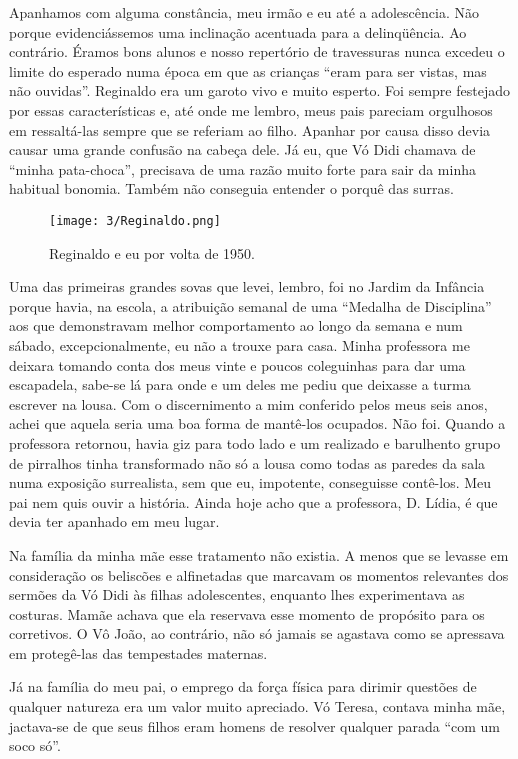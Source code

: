 Apanhamos com alguma constância, meu irmão e eu até a adolescência. 
Não porque evidenciássemos uma inclinação acentuada para a delinqüência. 
Ao contrário. 
Éramos bons alunos e nosso repertório de travessuras nunca excedeu o limite do esperado numa época em que as crianças “eram para ser vistas, mas não ouvidas”. 
Reginaldo era um garoto vivo e muito esperto. 
Foi sempre festejado por essas características e, até onde me lembro, meus pais pareciam orgulhosos em ressaltá-las sempre que se referiam ao filho. 
Apanhar por causa disso devia causar uma grande confusão na cabeça dele. Já eu, que Vó Didi chamava de “minha pata-choca”, precisava de uma razão muito forte para sair da minha habitual bonomia. 
Também não conseguia entender o porquê das surras.

\begin{figure}[H]
\centering
\texttt{[image: 3/Reginaldo.png]}
\caption{Reginaldo e eu por volta de 1950.}
\end{figure}

Uma das primeiras grandes sovas que levei, lembro, foi no Jardim da Infância porque havia, na escola, a atribuição semanal de uma “Medalha de Disciplina” aos que demonstravam melhor comportamento ao longo da semana e num sábado, excepcionalmente, eu não a trouxe para casa. 
Minha professora me deixara tomando conta dos meus vinte e poucos coleguinhas para dar uma escapadela, sabe-se lá para onde e um deles me pediu que deixasse a turma escrever na lousa. 
Com o discernimento a mim conferido pelos meus seis anos, achei que aquela seria uma boa forma de mantê-los ocupados. 
Não foi. 
Quando a professora retornou, havia giz para todo lado e um realizado e barulhento grupo de pirralhos tinha transformado não só a lousa como todas as paredes da sala numa exposição surrealista, sem que eu, impotente, conseguisse contê-los. 
Meu pai nem quis ouvir a história. 
Ainda hoje acho que a professora, D. Lídia, é que devia ter apanhado em meu lugar. 
 
Na família da minha mãe esse tratamento não existia. 
A menos que se levasse em consideração os beliscões e alfinetadas que marcavam os momentos relevantes dos sermões da Vó Didi às filhas adolescentes, enquanto lhes experimentava as costuras. 
Mamãe achava que ela reservava esse momento de propósito para os corretivos. O
Vô João, ao contrário, não só jamais se agastava como se apressava em protegê-las das tempestades maternas. 

Já na família do meu pai, o emprego da força física para dirimir questões de qualquer natureza era um valor muito apreciado. 
Vó Teresa, contava minha mãe, jactava-se de que seus filhos eram homens de resolver qualquer parada “com um soco só”. 

